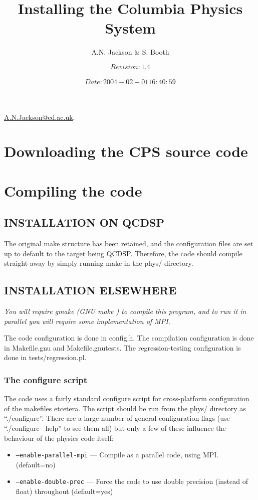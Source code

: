 \documentclass[12pt]{article}
\title{Installing the Columbia Physics System}
\author{A.N. Jackson \& S. Booth}
\date{\mbox{\small $$Revision: 1.4 $$  $$Date: 2004-02-01 16:40:59 $$}}
\begin{document}
\maketitle

\begin{flushright}
\href{mailto:A.N.Jackson@ed.ac.uk}{A.N.Jackson@ed.ac.uk}.
\end{flushright}

\tableofcontents

\newpage

\section{Downloading the CPS source code}

\section{Compiling the code}

\subsection{INSTALLATION ON QCDSP} 
The original make structure has been retained, and the configuration
files are set up to default to the target being QCDSP.  Therefore, the
code should compile straight away by simply running make in the phys/
directory.


\subsection{INSTALLATION ELSEWHERE}

{\large \emph{You will require gmake (GNU make ) to compile this program, and to
run it in parallel you will require some implementation of MPI.} }

The code configuration is done in config.h. The compilation
configuration is done in Makefile.gnu and Makefile.gnutests.  The
regression-testing configuration is done in tests/regression.pl.

\subsubsection{The configure script}
The code uses a fairly standard configure script for cross-platform
configuration of the makefiles etcetera.  The script should be run from the
phys/ directory as ``./configure''.  There are a large number of general
configuration flags (use ``./configure --help'' to see them all) but only a
few of these influence the behaviour of the physics code itself:
\begin{itemize}
 \item{\tt --enable-parallel-mpi} --- Compile as a parallel code, using MPI. (default=no) 
 \item{\tt --enable-double-prec} --- Force the code to use double precision (instead of float) throughout (default=yes) 
\end{itemize}
\end{document}
